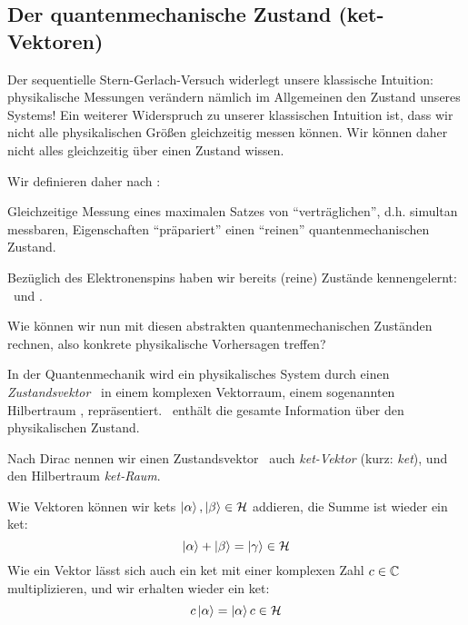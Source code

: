 \subsection{Der quantenmechanische Zustand (ket-Vektoren)}

Der sequentielle Stern-Gerlach-Versuch widerlegt unsere klassische Intuition: physikalische Messungen ver\"andern n\"amlich im Allgemeinen den Zustand unseres Systems! Ein weiterer Widerspruch zu unserer klassischen Intuition ist, dass wir nicht alle physikalischen Gr\"o\ss{}en gleichzeitig messen k\"onnen. Wir k\"onnen daher nicht alles gleichzeitig \"uber einen Zustand wissen.

Wir definieren daher nach \textcite{Nolting}:

\begin{post}
 Gleichzeitige Messung eines maximalen Satzes von \enquote{vertr\"aglichen}, d.h. simultan messbaren, Eigenschaften \enquote{pr\"apariert} einen \enquote{reinen} quantenmechanischen Zustand.
\end{post}

\begin{bsp}
 Bez\"uglich des Elektronenspins haben wir bereits (reine) Zust\"ande kennengelernt: \szus\ und \szds.
\end{bsp}

Wie k\"onnen wir nun mit diesen abstrakten quantenmechanischen Zust\"anden rechnen, also konkrete physikalische Vorhersagen treffen?

\begin{post}
 In der Quantenmechanik wird ein physikalisches System durch einen \emph{Zustandsvektor} \keta\ in einem komplexen Vektorraum, einem sogenannten Hilbertraum \hs, repr\"asentiert. \keta\ enth\"alt die gesamte Information \"uber den physikalischen Zustand. 
\end{post}

Nach Dirac nennen wir einen Zustandsvektor \keta\ auch \emph{ket-Vektor} (kurz: \emph{ket}), und den Hilbertraum \emph{ket-Raum}.

Wie Vektoren k\"onnen wir kets $\ket{\alpha}, \ket{\beta} \in \mathcal{H}$ addieren, die Summe ist wieder ein ket:
\begin{equation*}
 \ket{\alpha} + \ket{\beta} = \ket{\gamma} \in \mathcal{H}
\end{equation*}
Wie ein Vektor l\"asst sich auch ein ket mit einer komplexen Zahl $c \in \mathbb{C}$ multiplizieren, und wir erhalten wieder ein ket:
\begin{equation*}
 c \ket{\alpha} = \ket{\alpha} c \in \mathcal{H}
\end{equation*}


